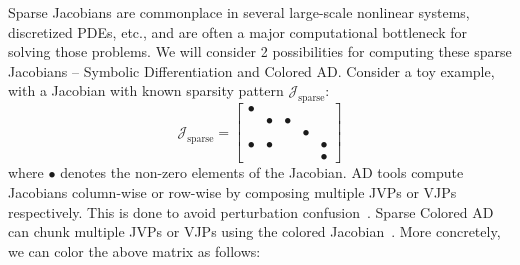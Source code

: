 Sparse Jacobians are commonplace in several large-scale nonlinear systems, discretized PDEs, etc., and are often a major computational bottleneck for solving those problems. We will consider 2 possibilities for computing these sparse Jacobians -- Symbolic Differentiation and Colored AD. Consider a toy example, with a Jacobian with known sparsity pattern $\mathcal{J}_{\text{sparse}}$:
%
\begin{equation}
    \mathcal{J}_{\text{sparse}} = \begin{bmatrix}
        \bullet &         &         &         &         \\
                & \bullet & \bullet &         &         \\
                &         &         & \bullet &         \\
        \bullet & \bullet &         &         & \bullet \\
                &         &         &         & \bullet
    \end{bmatrix}
\end{equation}
%
where $\bullet$ denotes the non-zero elements of the Jacobian. AD tools compute Jacobians column-wise or row-wise by composing multiple JVPs or VJPs respectively. This is done to avoid perturbation confusion~\cite{manzyuk2019perturbation}. Sparse Colored AD can chunk multiple JVPs or VJPs using the colored Jacobian~\cite{gebremedhin2005color}. More concretely, we can color the above matrix as follows:
%
